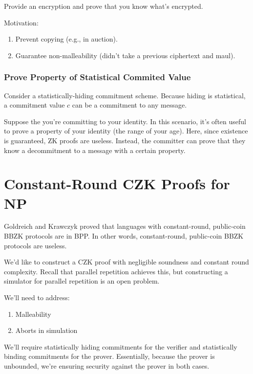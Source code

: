 \documentclass{article}
\theoremstyle{definition}
\begin{document}
Provide an encryption and prove that you know what's encrypted.

Motivation:
\begin{enumerate}
    \item Prevent copying (e.g., in auction).
    \item Guarantee non-malleability (didn't take a previous ciphertext and maul).
\end{enumerate}

\subsubsection{Prove Property of Statistical Commited Value}

Consider a statistically-hiding commitment scheme. Because hiding is statistical, a commitment value
$c$ can be a commitment to any message.

Suppose the you're committing to your identity. In this scenario, it's often useful to prove a property
of your identity (the range of your age). Here, since existence is guaranteed, ZK proofs are useless.
Instead, the committer can prove that they know a decommitment to a message with a certain property.

\newpage

\section{Constant-Round CZK Proofs for NP}

Goldreich and Krawczyk proved that languages with constant-round, public-coin BBZK protocols are in BPP. In other words,
constant-round, public-coin BBZK protocols are useless.

We'd like to construct a CZK proof with negligible soundness and constant round complexity. Recall that parallel repetition
achieves this, but constructing a simulator for parallel repetition is an open problem.

We'll need to address:
\begin{enumerate}
    \item Malleability 
    \item Aborts in simulation
\end{enumerate}

We'll require statistically hiding commitments for the verifier and statistically binding
commitments for the prover. Essentially, because the prover is unbounded, we're ensuring security
against the prover in both cases.
\end{document}
